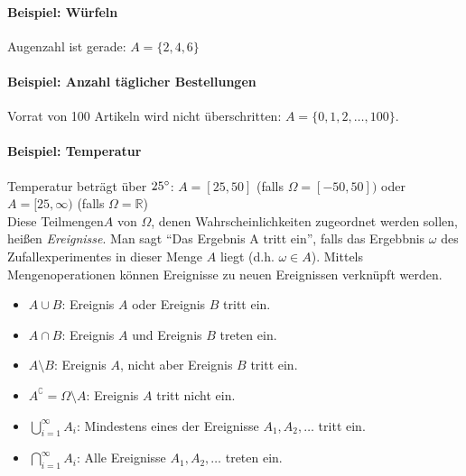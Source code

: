 \paragraph{Beispiel: Würfeln} Augenzahl ist gerade: $A = \{2,4,6\}$

\paragraph{Beispiel: Anzahl täglicher Bestellungen} Vorrat von 100 Artikeln wird nicht
überschritten: $A = \{0,1,2,\dots,100\}$.

\paragraph{Beispiel: Temperatur} Temperatur beträgt über $25\degree$:
$A = [25,50]$ (falls $\Omega = [-50,50])$ oder $A= [25, \infty)$ (falls $\Omega = \mathbb{R}$)
\\

Diese Teilmengen$A$ von $\Omega$, denen Wahrscheinlichkeiten zugeordnet werden sollen,
heißen \emph{Ereignisse}.
Man sagt \enquote{Das Ergebnis A tritt ein}, falls das Ergebbnis $\omega$ des Zufallexperimentes
in dieser Menge $A$ liegt (d.h. $\omega \in A$).
Mittels Mengenoperationen können Ereignisse zu neuen Ereignissen verknüpft werden.

\begin{itemize}
    \item $A \cup B$: Ereignis $A$ oder Ereignis $B$ tritt ein.

    \item $A \cap B$: Ereignis $A$ und Ereignis $B$ treten ein.

    \item $A\setminus B$: Ereignis $A$, nicht aber Ereignis $B$ tritt ein.

    \item $A^\complement = \Omega\setminus A$: Ereignis $A$ tritt nicht ein.

    \item $\bigcup\limits_{i=1}^\infty A_i$: Mindestens eines der Ereignisse
          $A_1, A_2, \dots$ tritt ein.

    \item $\bigcap\limits_{i=1}^\infty A_i$: Alle Ereignisse $A_1, A_2, \dots$
          treten ein.
\end{itemize}

